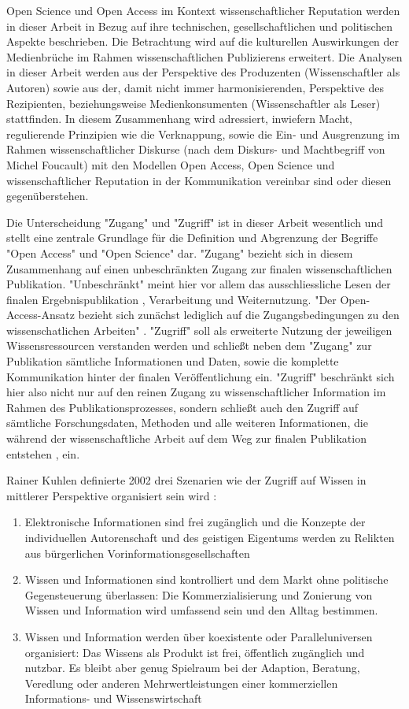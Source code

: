 Open Science und Open Access im Kontext wissenschaftlicher Reputation werden in dieser Arbeit in Bezug auf ihre technischen, gesellschaftlichen und politischen Aspekte beschrieben. Die Betrachtung wird auf die kulturellen Auswirkungen der Medienbrüche im Rahmen wissenschaftlichen Publizierens erweitert. Die Analysen in dieser Arbeit werden aus der Perspektive des Produzenten (Wissenschaftler als Autoren) sowie aus der, damit nicht immer harmonisierenden, Perspektive des Rezipienten, beziehungsweise Medienkonsumenten (Wissenschaftler als Leser) stattfinden. In diesem Zusammenhang wird adressiert, inwiefern Macht, regulierende Prinzipien wie die Verknappung, sowie die Ein- und Ausgrenzung im Rahmen wissenschaftlicher Diskurse (nach dem Diskurs- und Machtbegriff von Michel Foucault) mit den Modellen Open Access, Open Science und wissenschaftlicher Reputation in der Kommunikation vereinbar sind oder diesen gegenüberstehen.

Die Unterscheidung "Zugang" und "Zugriff" ist in dieser Arbeit wesentlich und stellt eine zentrale Grundlage für die Definition und Abgrenzung der Begriffe "Open Access" und "Open Science" dar. "Zugang" bezieht sich in diesem Zusammenhang auf einen unbeschränkten Zugang zur finalen wissenschaftlichen Publikation. "Unbeschränkt" meint hier vor allem das ausschliessliche Lesen der finalen Ergebnispublikation \cite{cite:9a}, Verarbeitung und Weiternutzung. "Der Open-Access-Ansatz bezieht sich zunächst lediglich auf die Zugangsbedingungen zu den wissenschatlichen Arbeiten" \cite{muller_2010_open}. "Zugriff" soll als erweiterte Nutzung der jeweiligen Wissensressourcen verstanden werden und schließt neben dem "Zugang" zur Publikation sämtliche Informationen und Daten, sowie die komplette Kommunikation hinter der finalen Veröffentlichung \cite{cite:9b} ein. "Zugriff" beschränkt sich hier also nicht nur auf den reinen Zugang zu wissenschaftlicher Information im Rahmen des Publikationsprozesses, sondern schließt auch den Zugriff auf sämtliche Forschungsdaten, Methoden und alle weiteren Informationen, die während der wissenschaftliche Arbeit auf dem Weg zur finalen Publikation entstehen \cite{cite:9c}, ein.

Rainer Kuhlen definierte 2002 drei Szenarien wie der Zugriff auf Wissen in mittlerer Perspektive organisiert sein wird \cite{Kuhlen_2002_universalaccess}:
\begin{enumerate}
\item Elektronische Informationen sind frei zugänglich und die Konzepte der individuellen Autorenschaft und des geistigen Eigentums werden zu Relikten aus bürgerlichen Vorinformationsgesellschaften
\item Wissen und Informationen sind kontrolliert und dem Markt ohne politische Gegensteuerung überlassen: Die Kommerzialisierung und Zonierung von Wissen und Information wird umfassend sein und den Alltag bestimmen.
\item Wissen und Information werden über koexistente oder Paralleluniversen organisiert: Das Wissens als Produkt ist frei, öffentlich zugänglich und nutzbar. Es bleibt aber genug Spielraum bei der Adaption, Beratung, Veredlung oder anderen Mehrwertleistungen einer kommerziellen Informations- und Wissenswirtschaft
\end{enumerate}

